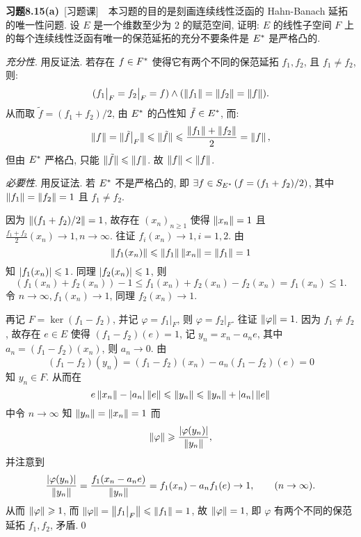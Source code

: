 	\textbf{习题8.15(a)}\ [习题课]\ \ 本习题的目的是刻画连续线性泛函的 Hahn-Banach 延拓的唯一性问题. 设 $ E $ 是一个维数至少为 2 的赋范空间, 证明: $ E $ 的线性子空间 $ F $ 上的每个连续线性泛函有唯一的保范延拓的充分不要条件是 $ E^{*} $ 是严格凸的.
	
	\begin{Proof}
		\textsl{充分性}. 用反证法. 若存在 $ f\in F^{*} $ 使得它有两个不同的保范延拓 $ f_{1}, f_{2} $, 且 $ f_{1}\ne f_{2} $, 则:
		\[
			(f_{1}\big|_{F}=f_{2}\big|_{F}=f)\land (\left\| f_{1} \right\|=\left\| f_{2} \right\|=\left\| f \right\|).
		\]
		从而取 $ \tilde{f}=(f_{1}+f_{2})/2 $, 由 $ E^{*} $ 的凸性知 $ \tilde{f}\in E^{*} $, 而:
		\[
			\left\| f \right\|=\lVert \tilde{f}\big|_{F}\rVert\leqslant\lVert \tilde{f}\rVert\leqslant\frac{\left\| f_{1} \right\|+\left\| f_{2} \right\|}{2}=\left\| f \right\|,
		\]
		但由 $ E^{*} $ 严格凸, 只能 $ \lVert \tilde{f}\rVert\leqslant\left\| f \right\| $. 故 $ \left\| f \right\|<\left\| f \right\| $.

		\textsl{必要性}. 用反证法. 若 $ E^{*} $ 不是严格凸的, 即 $ \exists f\in S_{E^{*}}\,(f=(f_{1}+f_{2})/2) $, 其中 $ \left\| f_{1} \right\|=\left\| f_{2} \right\|=1 $ 且 $ f_{1}\ne f_{2} $.
		
		因为 $ \left\| (f_{1}+f_{2})/2 \right\|=1 $, 故存在 $ (x_{n})_{n\geqslant1} $ 使得 $ \left\| x_{n} \right\|=1 $ 且 $ \frac{f_{1}+f_{2}}{2}(x_{n})\to 1, n\to\infty $. 往证 $ f_{i}(x_{n})\to1, i=1, 2 $. 由
		\[
			\left\| f_{1}(x_{n}) \right\|\leqslant\left\| f_{1} \right\|\left\| x_{n} \right\|=\left\| f_{1} \right\|=1
		\]
		知 $ \left| f_{1}(x_{n}) \right| \leqslant1 $. 同理 $ \left| f_{2}(x_{n}) \right| \leqslant1 $, 则
		\[
			(f_{1}(x_{n})+f_{2}(x_{n}))-1\leqslant f_{1}(x_{n})+f_{2}(x_{n})-f_{2}(x_{n})=f_{1}(x_{n})\leqslant1.
		\]
		令 $ n\to \infty, f_{1}(x_{n})\to 1 $, 同理 $ f_{2}(x_{n})\to1 $.

		再记 $ F=\ker(f_{1}-f_{2}) $, 并记 $ \varphi=f_{1}\big|_{F} $, 则 $ \varphi=f_{2}\big|_{F} $. 往证 $ \left\| \varphi \right\|=1 $. 因为 $ f_{1}\ne f_{2} $, 故存在 $ e\in E $ 使得 $ (f_{1}-f_{2})(e)=1 $, 记 $ y_{n}=x_{n}-a_{n}e $, 其中 $ a_{n}=(f_{1}-f_{2})(x_{n}) $, 则 $ a_{n}\to0 $. 由
		\[
			(f_{1}-f_{2})(y_{n})=(f_{1}-f_{2})(x_{n})-a_{n}(f_{1}-f_{2})(e)=0
		\]
		知 $ y_{n}\in F $. 从而在
		\[
			e\left\| x_{n} \right\|-\left| a_{n} \right| \left\| e \right\|\leqslant\left\| y_{n} \right\|\leqslant\left\| y_{n} \right\|+\left| a_{n} \right| \left\| e \right\|
		\]
		中令 $ n\to\infty $ 知 $ \left\| y_{n} \right\|=\left\| x_{n} \right\|=1 $ 而
		\[
			\left\| \varphi \right\|\geqslant\frac{\left| \varphi(y_{n}) \right| }{\left\| y_{n} \right\|},
		\]
		并注意到
		\[
			\frac{\left| \varphi(y_{n}) \right| }{\left\| y_{n} \right\|}=\frac{f_{1}(x_{n}-a_{n}e)}{\left\| y_{n} \right\|}=f_{1}(x_{n})-a_{n}f_{1}(e)\to 1,\qquad (n\to\infty).
		\]
		从而 $ \left\| \varphi \right\|\geqslant1 $, 而 $ \left\| \varphi \right\|=\left\| f_{1}\big|_{F} \right\|\leqslant\left\| f_{1} \right\|=1 $, 故 $ \left\| \varphi \right\|=1 $, 即 $ \varphi $ 有两个不同的保范延拓 $ f_{1}, f_{2} $, 矛盾.\qed
	\end{Proof}

